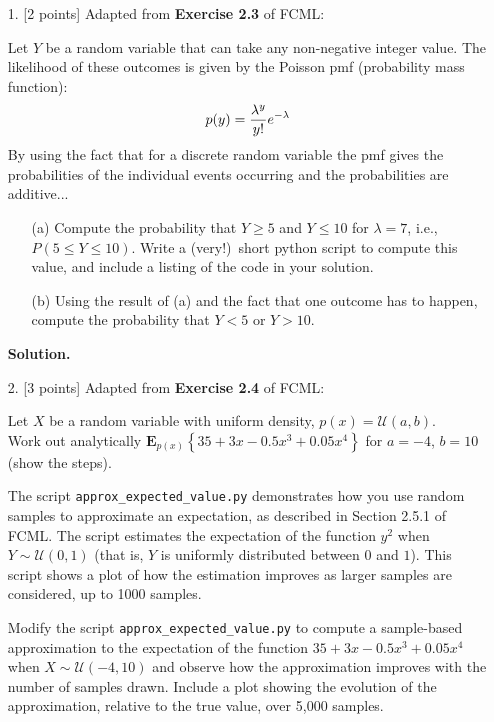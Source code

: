 \documentclass[10pt]{article}
\begin{document}
\newpage
\begin{itemize}

\item[1.] [2 points]
Adapted from {\bf Exercise 2.3} of FCML:

Let $Y$ be a random variable that can take any non-negative integer value.  The likelihood of these outcomes is given by the Poisson pmf (probability mass function):
\begin{eqnarray}
p(y) = {\lambda^y\over y!} e^{-\lambda}
\end{eqnarray}
By using the fact that for a discrete random variable the pmf gives the probabilities of the individual events occurring and the probabilities are additive...
\begin{enumerate}
\item[(a)] Compute the probability that $Y \geq 5$ and $Y \leq 10$ for $\lambda = 7$, i.e., $P(5 \leq Y \leq 10)$.  Write a (very!)~short python script to compute this value, and include a listing of the code in your solution.
\item[(b)] Using the result of (a) and the fact that one outcome has to happen, compute the probability that $Y < 5$ or $Y > 10$.
\end{enumerate}

{\bf Solution.} %


\item[2.] [3 points]
Adapted from {\bf Exercise 2.4} of FCML:

Let $X$ be a random variable with uniform density, $p(x) = \mathcal{U}(a,b)$.  \\
Work out analytically $\mathbf{E}_{p(x)} \left\{ 35 + 3x - 0.5x^3 + 0.05x^4 \right\}$ for $a=-4$, $b=10$ (show the steps).  

The script {\tt approx\_expected\_value.py} demonstrates how you use random samples to approximate an expectation, as described in Section 2.5.1 of FCML.  The script estimates the expectation of the function $y^2$ when $Y \sim \mathcal{U}(0,1)$ (that is, $Y$ is uniformly distributed between $0$ and $1$).  This script shows a plot of how the estimation improves as larger samples are considered, up to 1000 samples.

Modify the script {\tt approx\_expected\_value.py} to compute a sample-based approximation to the expectation of the function $35 + 3x - 0.5x^3 + 0.05x^4$ when $X \sim \mathcal{U}(-4,10)$ and observe how the approximation improves with the number of samples drawn.  Include a plot showing the evolution of the approximation, relative to the true value, over 5,000 samples.


\end{itemize}
\end{document}

